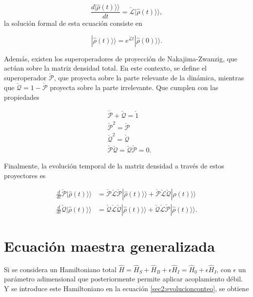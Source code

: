 \begin{equation*}
    \frac{d|\hat{\rho}(t) \rangle \rangle}{dt} = \check{\mathcal{L}}|\hat{\rho}(t) \rangle \rangle,
\end{equation*}
la solución formal de esta ecuación consiste en

\begin{equation}
    |\hat{\rho}(t)\rangle \rangle = e^{\check{\mathcal{L}}t}|\hat{\rho}(0)\rangle \rangle. 
    \label{sec2liouvilleformal}
\end{equation}

Además, existen los superoperadores de proyección de Nakajima-Zwanzig, que actúan sobre la matriz densidad total. En este contexto, se define el superoperador \( \check{\mathcal{P}} \), que proyecta sobre la parte relevante de la dinámica, mientras que \( \check{\mathcal{Q}} = 1 - \check{\mathcal{P}} \) proyecta sobre la parte irrelevante\cite{zwanzig1966statistical}. Que cumplen con las propiedades

\begin{align*}
    & \check{\mathcal{P}} + \check{\mathcal{Q}} = \check{1} \\
    & \check{\mathcal{P}}^{2} = \check{\mathcal{P}} \\
    & \check{\mathcal{Q}}^{2} = \check{\mathcal{Q}} \\
    & \check{\mathcal{P}}\check{\mathcal{Q}} = \check{\mathcal{Q}}\check{\mathcal{P}} = 0.
\end{align*}    

Finalmente, la evolución temporal de la matriz densidad a través de estos proyectores es 

\begin{align*}
    \frac{d}{dt}\check{\mathcal{P}}|\hat{\rho}(t)\rangle \rangle & = \check{\mathcal{P}}\check{\mathcal{L}}\check{\mathcal{P}}|\hat{\rho}(t)\rangle \rangle  + \check{\mathcal{P}}\check{\mathcal{L}}\check{\mathcal{Q}}|\hat{\rho}(t)\rangle \rangle \\
    \frac{d}{dt}\check{\mathcal{Q}}|\hat{\rho}(t)\rangle \rangle  & = \check{\mathcal{Q}}\check{\mathcal{L}}\check{\mathcal{Q}}|\hat{\rho}(t)\rangle \rangle  + \check{\mathcal{Q}}\check{\mathcal{L}}\check{\mathcal{P}}|\hat{\rho}(t)\rangle \rangle.
\end{align*}

\label{sec2:superop}

\newpage

\section{Ecuación maestra generalizada}
Si se considera un Hamiltoniano total $\hat{H} = \hat{H}_{S} + \hat{H}_{B} + \epsilon \hat{H}_{I} = \hat{H}_{0} + \epsilon \hat{H}_{I}$, con $\epsilon$ un parámetro adimensional que posteriormente permite aplicar acoplamiento débil. Y se introduce este Hamiltoniano en la ecuación \ref{sec2:evolucionconteo}, se obtiene 

